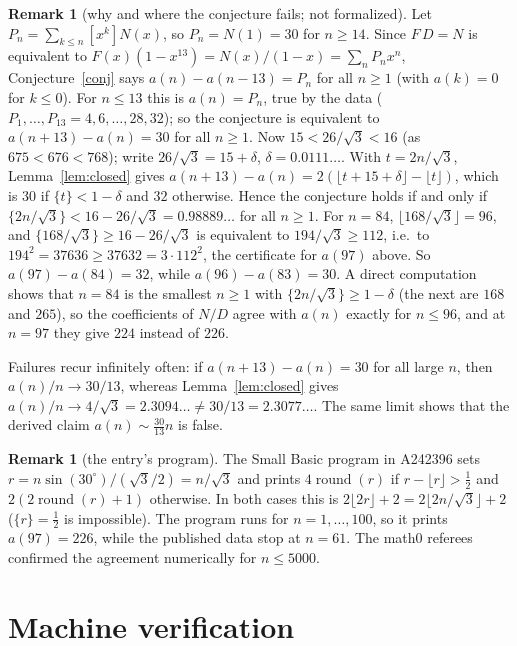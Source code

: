 \documentclass[11pt]{amsart}
\theoremstyle{plain}
\theoremstyle{definition}
\newtheorem{remark}[theorem]{Remark}
\newcommand{\coef}[1]{[x^{#1}]}
\begin{document}
\begin{remark}[why and where the conjecture fails; not formalized]\label{rem:mech}
Let $P_n=\sum_{k\le n}\coef{k}N(x)$, so $P_n=N(1)=30$ for $n\ge14$. Since $F\,D=N$ is equivalent to $F(x)(1-x^{13})=N(x)/(1-x)=\sum_nP_nx^n$, Conjecture~\ref{conj} says $a(n)-a(n-13)=P_n$ for all $n\ge1$ (with $a(k)=0$ for $k\le0$). For $n\le13$ this is $a(n)=P_n$, true by the data ($P_1,\dots,P_{13}=4,6,\dots,28,32$); so the conjecture is equivalent to $a(n+13)-a(n)=30$ for all $n\ge1$. Now $15<26/\sqrt3<16$ (as $675<676<768$); write $26/\sqrt3=15+\delta$, $\delta=0.0111\ldots$. With $t=2n/\sqrt3$, Lemma~\ref{lem:closed} gives $a(n+13)-a(n)=2(\lfloor t+15+\delta\rfloor-\lfloor t\rfloor)$, which is $30$ if $\{t\}<1-\delta$ and $32$ otherwise. Hence the conjecture holds if and only if $\{2n/\sqrt3\}<16-26/\sqrt3=0.98889\ldots$ for all $n\ge1$. For $n=84$, $\lfloor168/\sqrt3\rfloor=96$, and $\{168/\sqrt3\}\ge16-26/\sqrt3$ is equivalent to $194/\sqrt3\ge112$, i.e.\ to $194^2=37636\ge37632=3\cdot112^2$, the certificate for $a(97)$ above. So $a(97)-a(84)=32$, while $a(96)-a(83)=30$. A direct computation shows that $n=84$ is the smallest $n\ge1$ with $\{2n/\sqrt3\}\ge1-\delta$ (the next are $168$ and $265$), so the coefficients of $N/D$ agree with $a(n)$ exactly for $n\le96$, and at $n=97$ they give $224$ instead of $226$.

Failures recur infinitely often: if $a(n+13)-a(n)=30$ for all large $n$, then $a(n)/n\to30/13$, whereas Lemma~\ref{lem:closed} gives $a(n)/n\to4/\sqrt3=2.3094\ldots\ne30/13=2.3077\ldots$. The same limit shows that the derived claim $a(n)\sim\frac{30}{13}n$ is false.
\end{remark}

\begin{remark}[the entry's program]\label{rem:program}
The Small Basic program in A242396 sets $r=n\sin(30^\circ)/(\sqrt3/2)=n/\sqrt3$ and prints $4\operatorname{round}(r)$ if $r-\lfloor r\rfloor>\frac12$ and $2(2\operatorname{round}(r)+1)$ otherwise. In both cases this is $2\lfloor2r\rfloor+2=2\lfloor2n/\sqrt3\rfloor+2$ ($\{r\}=\frac12$ is impossible). The program runs for $n=1,\dots,100$, so it prints $a(97)=226$, while the published data stop at $n=61$. The math0 referees confirmed the agreement numerically for $n\le5000$.
\end{remark}

\section{Machine verification}\label{sec:lean}
\end{document}
